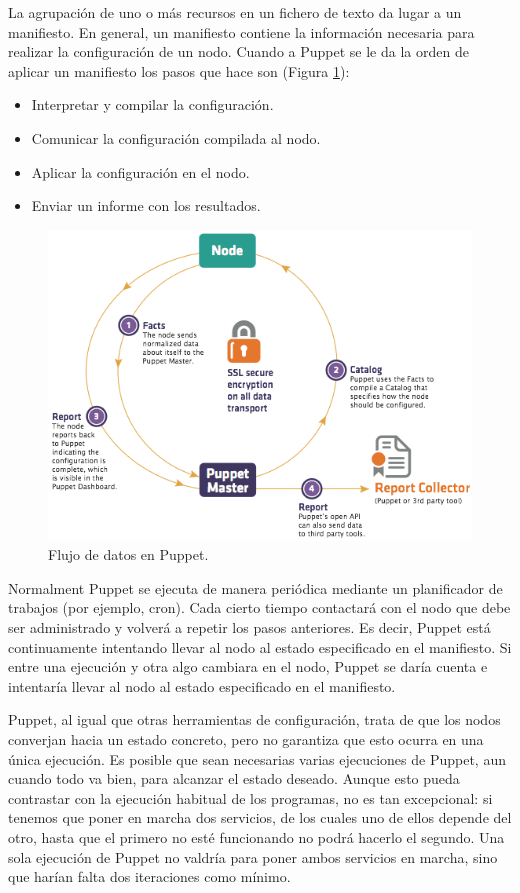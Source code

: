 La agrupación de uno o más recursos en un fichero de texto da lugar a un manifiesto. En general, un manifiesto contiene la información necesaria para realizar la configuración de un nodo. Cuando a Puppet se le da la orden de aplicar un manifiesto los pasos que hace son (Figura \ref{figure:puppet-dataflow}):

\begin{itemize}
\item Interpretar y compilar la configuración.
\item Comunicar la configuración compilada al nodo.
\item Aplicar la configuración en el nodo.
\item Enviar un informe con los resultados.
\end{itemize}

\begin{figure} [!htbp]
  \centering
  \includegraphics[width=13.5cm]{figuras/Puppet_Dataflow.png}
  \caption{Flujo de datos en Puppet.}
\label{figure:puppet-dataflow}
\end{figure}

Normalment Puppet se ejecuta de manera periódica mediante un planificador de trabajos (por ejemplo, cron). Cada cierto tiempo contactará con el nodo que debe ser administrado y volverá a repetir los pasos anteriores. Es decir, Puppet está continuamente intentando llevar al nodo al estado especificado en el manifiesto. Si entre una ejecución y otra algo cambiara en el nodo, Puppet se daría cuenta e intentaría llevar al nodo al estado especificado en el manifiesto.

Puppet, al igual que otras herramientas de configuración, trata de que los nodos converjan hacia un estado concreto, pero no garantiza que esto ocurra en una única ejecución. Es posible que sean necesarias varias ejecuciones de Puppet, aun cuando todo va bien, para alcanzar el estado deseado. Aunque esto pueda contrastar con la ejecución habitual de los programas, no es tan excepcional: si tenemos que poner en marcha dos servicios, de los cuales uno de ellos depende del otro, hasta que el primero no esté funcionando no podrá hacerlo el segundo. Una sola ejecución de Puppet no valdría para poner ambos servicios en marcha, sino que harían falta dos iteraciones como mínimo.
